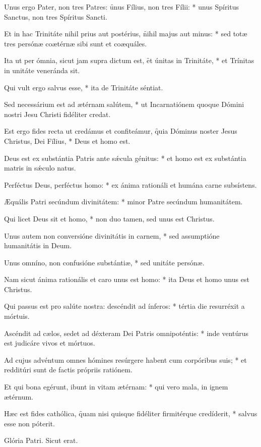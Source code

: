 \begin{psalmus}
Unus ergo Pater, non tres Patres: \f unus Fílius, non tres Fílii: * unus Spíritus Sanctus, non tres Spíritus Sancti.

Et in hac Trinitáte nihil prius aut postérius, \f nihil majus aut minus: * sed totæ tres persónæ coætérnæ sibi sunt et coæquáles.

Ita ut per ómnia, sicut jam supra dictum est, \f et únitas in Trinitáte, * et Trínitas in unitáte veneránda sit.

Qui vult ergo salvus esse, * ita de Trinitáte séntiat.

Sed necessárium est ad ætérnam salútem, * ut Incarnatiónem quoque Dómini nostri Jesu Christi fidéliter credat.

Est ergo fides recta ut credámus et confiteámur, \f quia Dóminus noster Jesus Christus, Dei Fílius, * Deus et homo est.

Deus est ex substántia Patris ante sǽcula génitus: * et homo est ex substántia matris in sǽculo natus.

Perféctus Deus, perféctus homo: * ex ánima rationáli et humána carne subsístens.

Æquális Patri secúndum divinitátem: * minor Patre secúndum humanitátem.

Qui licet Deus sit et homo, * non duo tamen, sed unus est Christus.

Unus autem non conversióne divinitátis in carnem, * sed assumptióne humanitátis in Deum.

Unus omníno, non confusióne substántiæ, * sed unitáte persónæ.

Nam sicut ánima rationális et caro unus est homo: * ita Deus et homo unus est Christus.

Qui passus est pro salúte nostra: descéndit ad ínferos: * tértia die resurréxit a mórtuis.

Ascéndit ad cælos, sedet ad déxteram Dei Patris omnipoténtis: * inde ventúrus est judicáre vivos et mórtuos.

Ad cujus advéntum omnes hómines resúrgere habent cum corpóribus suis; * et redditúri sunt de factis própriis ratiónem.

Et qui bona egérunt, ibunt in vitam ætérnam: * qui vero mala, in ignem ætérnum.

Hæc est fides cathólica, \f quam nisi quisque fidéliter firmitérque credíderit, * salvus esse non póterit.

Glória Patri. Sicut erat.

\end{psalmus}
